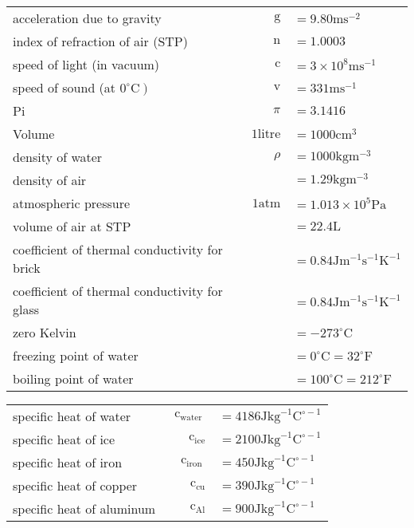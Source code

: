 \documentclass{extarticle}
\begin{document}
\begin{tabularx}{\textwidth}{@{}X@{}r@{}l@{}}

acceleration due to gravity & $\mathrm{g}$ & $=9.80 \mathrm{m} \mathrm{s}^{-2}$ \\
index of refraction of air (STP) & $\mathrm{n}$ & $=1.0003$ \\
speed of light (in vacuum) & $\mathrm{c}$ & $=3 \times 10^{8} \mathrm{ms}^{-1}$ \\
speed of sound (at $\left.0^{\circ} \mathrm{C}\right)$ & $\mathrm{v}$ & $=331 \mathrm{ms}^{-1}$ \\
Pi & $\pi$ & $=3.1416$ \\
Volume & $1 \text {litre}$ & $=1000 \mathrm{cm}^{3}$ \\
density of water & $\rho$ & $=1000 \mathrm{kg} \mathrm{m}^{-3}$ \\
density of air & & $=1.29 \mathrm{kg} \mathrm{m}^{-3}$ \\
atmospheric pressure & $1 \mathrm{atm}$ & $=1.013 \times 10^{5} \mathrm{Pa}$ \\
volume of air at STP & & $=22.4 \mathrm{L}$ \\
coefficient of thermal conductivity for brick & & $=0.84 \mathrm{J} \mathrm{m}^{-1} \mathrm{s}^{-1} \mathrm{K}^{-1}$ \\
coefficient of thermal conductivity for glass & & $=0.84 \mathrm{J} \mathrm{m}^{-1} \mathrm{s}^{-1} \mathrm{K}^{-1}$ \\
zero Kelvin & & $=-273^{\circ} \mathrm{C}$ \\
freezing point of water & & $=0^{\circ} \mathrm{C}=32^{\circ} \mathrm{F}$ \\
boiling point of water & & $=100^{\circ} \mathrm{C}=212^{\circ} \mathrm{F}$ \\

\end{tabularx}

\begin{tabularx}{\textwidth}{@{}X@{}r@{}l@{}}

specific heat of water & $\mathrm{c}_{\text {water }}$ & $=4186 \mathrm{J} \mathrm{kg}^{-1} \mathrm{C}^{\circ-1}$ \\
specific heat of ice & $\quad \mathrm{c}_{\mathrm{ice}}$ & $=2100 \mathrm{J} \mathrm{kg}^{-1} \mathrm{C}^{\circ-1}$ \\
specific heat of iron & $\quad \mathrm{c}_{\text {iron }}$ & $=450 \mathrm{J} \mathrm{kg}^{-1} \mathrm{C}^{\circ-1}$ \\
specific heat of copper & $\mathrm{c}_{\mathrm{cu}}$ & $=390 \mathrm{J} \mathrm{kg}^{-1} \mathrm{C}^{\circ-1}$ \\
specific heat of aluminum & $\mathrm{c}_{\mathrm{Al}}$ & $=900 \mathrm{J} \mathrm{kg}^{-1} \mathrm{C}^{\circ-1}$ \\

\end{tabularx}
\end{document}
